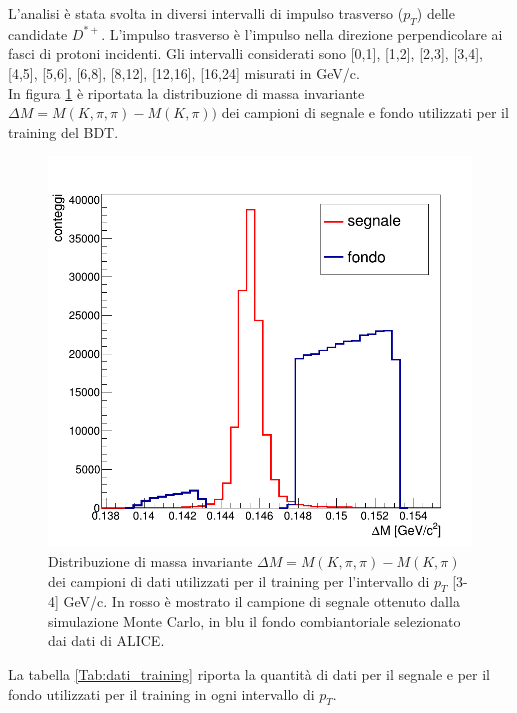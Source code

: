 L'analisi \`e stata svolta in diversi intervalli di impulso trasverso ($p_T$) delle candidate $D^{*+}$. L'impulso trasverso \`e l'impulso nella direzione perpendicolare ai fasci di protoni incidenti. Gli intervalli considerati sono [0,1], [1,2], [2,3], [3,4], [4,5], [5,6], [6,8], [8,12], [12,16], [16,24] misurati in GeV/c. 
\\In figura \ref{fig:dati_training} è riportata la distribuzione di massa invariante $\Delta M = M(K,\pi,\pi)-M(K,\pi))$ dei campioni di segnale e fondo utilizzati per il training del BDT. 

    \begin{figure}[htbp] 
        \centering
        \includegraphics[width=0.7\linewidth]{training&testing/dati_training.png}
        \caption{Distribuzione di massa invariante $\Delta M = M(K,\pi,\pi)-M(K,\pi)$ dei campioni di dati utilizzati per il training per l'intervallo di $p_T$ [3-4] GeV/c. In rosso \`e mostrato il campione di segnale ottenuto dalla simulazione Monte Carlo, in blu il fondo combiantoriale selezionato dai dati di ALICE.}
        \label{fig:dati_training}
    \end{figure}
    
La tabella \ref{Tab:dati_training} riporta la quantità di dati per il segnale e per il fondo utilizzati per il training in ogni intervallo di $p_T$. 
 
